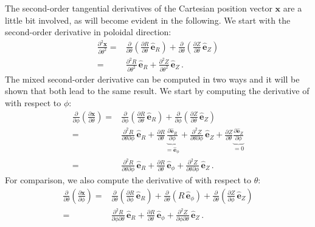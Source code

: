 The second-order tangential derivatives of the Cartesian position vector $\mathbf{x}$ are a little bit involved,
as will become evident in the following.
We start with the second-order derivative in poloidal direction:
\begin{align}
       \frac{\partial^2 \mathbf{x}}{\partial \theta^2}
  =&   \frac{\partial}{\partial \theta} \left( \frac{\partial R}{\partial \theta} \, \hat{\mathbf{e}}_R \right)
     + \frac{\partial}{\partial \theta} \left( \frac{\partial Z}{\partial \theta} \, \hat{\mathbf{e}}_Z \right) \nonumber \\
  =&   \frac{\partial^2 R}{\partial \theta^2} \, \hat{\mathbf{e}}_R
     + \frac{\partial^2 Z}{\partial \theta^2} \, \hat{\mathbf{e}}_Z \label{eqn:d2Xdt2} \, .
\end{align}
The mixed second-order derivative can be computed in two ways and it will be shown that both lead to the same result.
We start by computing the derivative of  with respect to $\phi$:
\begin{align}
      \frac{\partial}{\partial \phi} \left( \frac{\partial \mathbf{x}}{\partial \theta} \right)
 =&   \frac{\partial}{\partial \phi} \left( \frac{\partial R}{\partial \theta} \, \hat{\mathbf{e}}_R \right)
    + \frac{\partial}{\partial \phi} \left( \frac{\partial Z}{\partial \theta} \, \hat{\mathbf{e}}_Z \right) \nonumber \\
 =&   \frac{\partial^2 R}{\partial \theta \partial \phi} \, \hat{\mathbf{e}}_R
    + \frac{\partial R}{\partial \theta} \underbrace{\frac{\partial \hat{\mathbf{e}}_R}{\partial \phi}}_{=\hat{\mathbf{e}}_\phi}
    + \frac{\partial^2 Z}{\partial \theta \partial \phi} \, \hat{\mathbf{e}}_Z
    + \frac{\partial Z}{\partial \theta} \underbrace{\frac{\partial \hat{\mathbf{e}}_Z}{\partial \phi}}_{=0} \nonumber \\
 =&   \frac{\partial^2 R}{\partial \theta \partial \phi} \, \hat{\mathbf{e}}_R
    + \frac{\partial R}{\partial \theta} \, \hat{\mathbf{e}}_\phi
    + \frac{\partial^2 Z}{\partial \theta \partial \phi} \, \hat{\mathbf{e}}_Z \label{eqn:d2Xdtdz} \, .
\end{align}
For comparison, we also compute the derivative of  with respect to $\theta$:
\begin{align}
      \frac{\partial}{\partial \theta} \left( \frac{\partial \mathbf{x}}{\partial \phi} \right)
 =&   \frac{\partial}{\partial \theta} \left( \frac{\partial R}{\partial \phi  } \, \hat{\mathbf{e}}_R    \right)
    + \frac{\partial}{\partial \theta} \left(                R                   \, \hat{\mathbf{e}}_\phi \right)
    + \frac{\partial}{\partial \theta} \left( \frac{\partial Z}{\partial \phi  } \, \hat{\mathbf{e}}_Z    \right) \nonumber \\
 =&   \frac{\partial^2 R}{\partial \phi \partial \theta} \, \hat{\mathbf{e}}_R
    + \frac{\partial R}{\partial \theta}                 \, \hat{\mathbf{e}}_\phi
    + \frac{\partial^2 Z}{\partial \phi \partial \theta} \, \hat{\mathbf{e}}_Z  \label{eqn:d2Xdzdt} \, .
\end{align}
